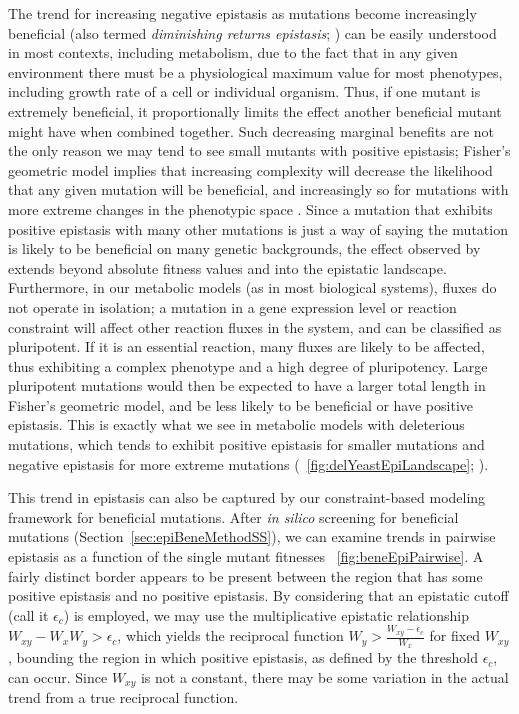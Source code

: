 The trend for increasing negative epistasis as mutations become
increasingly beneficial (also termed \textit{diminishing returns
epistasis}; \citep{Chou2011}) can be easily understood in most
contexts, including metabolism, due to the fact that in any given
environment there must be a physiological maximum value for most
phenotypes, including growth rate of a cell or individual organism.
Thus, if one mutant is extremely beneficial, it proportionally limits
the effect another beneficial mutant might have when combined
together. Such decreasing marginal benefits are not the only reason we
may tend to see small mutants with positive epistasis; Fisher's
geometric model implies that increasing complexity will decrease the
likelihood that any given mutation will be beneficial, and
increasingly so for mutations with more extreme changes in the
phenotypic space \citep{Orr2000}. Since a mutation that exhibits
positive epistasis with many other mutations is just a way of saying
the mutation is likely to be beneficial on many genetic backgrounds,
the effect observed by \citet{Orr2000} extends beyond absolute fitness
values and into the epistatic landscape. Furthermore, in our
metabolic models (as in most biological systems), fluxes do not
operate in isolation; a mutation in a gene expression level or
reaction constraint will affect other reaction fluxes in the system,
and can be classified as pluripotent. If it is an essential reaction,
many fluxes are likely to be affected, thus exhibiting a complex
phenotype and a high degree of pluripotency. Large pluripotent
mutations would then be expected to have a larger total length in
Fisher's geometric model, and be less likely to be beneficial or have
positive epistasis.  This is exactly what we see in metabolic models
with deleterious mutations, which tends to exhibit positive epistasis
for smaller mutations and negative epistasis for more extreme
mutations (\suppOrApp \Fig~\ref{fig:delYeastEpiLandscape};
\citep{He2010, Xu2012}).


This trend in epistasis can also be captured by our constraint-based
modeling framework for beneficial mutations. After \textit{in silico}
screening for beneficial mutations
(Section~\ref{sec:epiBeneMethodSS}), we can examine trends in
pairwise epistasis as a function of the single mutant fitnesses 
\Fig~\ref{fig:beneEpiPairwise}. A fairly distinct border appears
to be present between the region that has some positive epistasis and
no positive epistasis. By considering that an epistatic cutoff (call
it $\epsilon_c$) is employed, we may use the multiplicative epistatic
relationship $W_{xy} - W_x W_y > \epsilon_c$, which yields the
reciprocal function $W_y > \frac{W_{xy} - \epsilon_c}{W_x}$ for fixed
$W_{xy}$, bounding the region in which positive epistasis, as
defined by the threshold $\epsilon_c$, can occur. Since $W_{xy}$ is not a constant,
there may be some variation in the actual trend from a true reciprocal
function.

